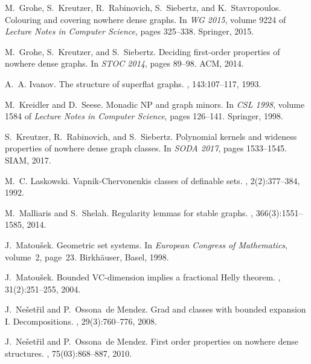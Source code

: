 \documentclass[11pt, fleqn]{article}
\theoremstyle{plain}
\theoremstyle{nonumberplain}
\begin{document}
\begin{thebibliography}{10}
M.~Grohe, S.~Kreutzer, R.~Rabinovich, S.~Siebertz, and K.~Stavropoulos.
\newblock Colouring and covering nowhere dense graphs.
\newblock In {\em {WG 2015}}, volume 9224 of {\em Lecture Notes in Computer
  Science}, pages 325--338. Springer, 2015.

M.~Grohe, S.~Kreutzer, and S.~Siebertz.
\newblock Deciding first-order properties of nowhere dense graphs.
\newblock In {\em STOC 2014}, pages 89--98. ACM, 2014.

A.~A. Ivanov.
\newblock The structure of superflat graphs.
, 143:107--117, 1993.

M.~Kreidler and D.~Seese.
\newblock Monadic {NP} and graph minors.
\newblock In {\em {CSL 1998}}, volume 1584 of {\em Lecture Notes in Computer
  Science}, pages 126--141. Springer, 1998.

S.~Kreutzer, R.~Rabinovich, and S.~Siebertz.
\newblock Polynomial kernels and wideness properties of nowhere dense graph
  classes.
\newblock In {\em {SODA 2017}}, pages 1533--1545. {SIAM}, 2017.

M.~C. Laskowski.
\newblock Vapnik-{C}hervonenkis classes of definable sets.
, 2(2):377--384,
  1992.

M.~Malliaris and S.~Shelah.
\newblock Regularity lemmas for stable graphs.
,
  366(3):1551--1585, 2014.

J.~Matou{\v{s}}ek.
\newblock Geometric set systems.
\newblock In {\em European Congress of Mathematics}, volume~2, page~23.
  Birkh{\"a}user, Basel, 1998.

J.~Matou{\v{s}}ek.
\newblock Bounded {VC}-dimension implies a fractional {H}elly theorem.
, 31(2):251--255, 2004.

J.~Ne{\v{s}}et{\v{r}}il and P.~Ossona~de Mendez.
\newblock Grad and classes with bounded expansion {I}. {D}ecompositions.
, 29(3):760--776, 2008.

J.~Ne{\v{s}}et{\v{r}}il and P.~Ossona~de Mendez.
\newblock First order properties on nowhere dense structures.
, 75(03):868--887, 2010.


\end{thebibliography}
\end{document}
